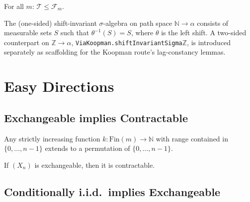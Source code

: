 \begin{lemma}
  \label{lem:tailSigma_le_futureFiltration}
  \leanok
  For all $m$: $\mathcal{T} \le \mathcal{F}_m$.
\end{lemma}

\begin{definition}
  \label{def:shiftInvariantSigma}
  \leanok
  The (one-sided) shift-invariant $\sigma$-algebra on path space $\mathbb{N} \to \alpha$
  consists of measurable sets $S$ such that $\theta^{-1}(S) = S$, where $\theta$ is the
  left shift. A two-sided counterpart on $\mathbb{Z} \to \alpha$,
  \texttt{ViaKoopman.shiftInvariantSigma}$\mathbb{Z}$, is introduced separately as scaffolding for
  the Koopman route's lag-constancy lemmas.
\end{definition}


\chapter{Easy Directions}

\section{Exchangeable implies Contractable}

\begin{lemma}
  \label{lem:perm_extension}
  \leanok
  Any strictly increasing function $k : \mathrm{Fin}(m) \to \mathbb{N}$ with range
  contained in $\{0, \ldots, n-1\}$ extends to a permutation of $\{0, \ldots, n-1\}$.
\end{lemma}

\begin{theorem}
  \label{thm:contractable_of_exchangeable}
  \leanok
  If $(X_n)$ is exchangeable, then it is contractable.
\end{theorem}

\section{Conditionally i.i.d.\ implies Exchangeable}

